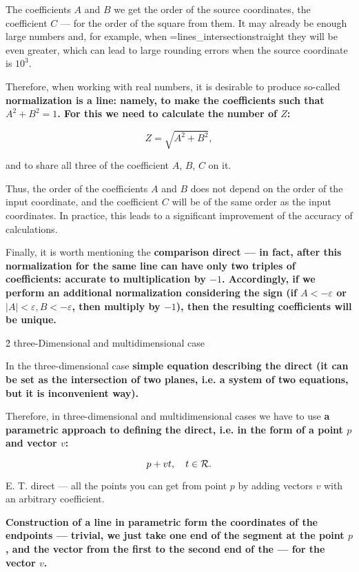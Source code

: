 The coefficients $A$ and $B$ we get the order of the source coordinates, the coefficient $C$ --- for the order of the square from them. It may already be enough large numbers and, for example, when \algohref=lines_intersection{straight} they will be even greater, which can lead to large rounding errors when the source coordinate is $10^3$.

Therefore, when working with real numbers, it is desirable to produce so-called \bf{normalization} is a line: namely, to make the coefficients such that $A^2 + B^2 = 1$. For this we need to calculate the number of $Z$:

$$ Z = \sqrt{ A^2 + B^2 }, $$

and to share all three of the coefficient $A$, $B$, $C$ on it.

Thus, the order of the coefficients $A$ and $B$ does not depend on the order of the input coordinate, and the coefficient $C$ will be of the same order as the input coordinates. In practice, this leads to a significant improvement of the accuracy of calculations.

Finally, it is worth mentioning the \bf{comparison} direct --- in fact, after this normalization for the same line can have only two triples of coefficients: accurate to multiplication by $-1$. Accordingly, if we perform an additional normalization considering the sign (if $A<-\varepsilon$ or $|A|<\varepsilon, B<-\varepsilon$, then multiply by $-1$), then the resulting coefficients will be unique.


\h2{ three-Dimensional and multidimensional case }

In the three-dimensional case \bf{simple equation} describing the direct (it can be set as the intersection of two planes, i.e. a system of two equations, but it is inconvenient way).

Therefore, in three-dimensional and multidimensional cases we have to use \bf{a parametric approach to defining the direct}, i.e. in the form of a point $p$ and vector $v$:

$$ p + v t, ~~~ t \in \cal{R}. $$

E. T. direct --- all the points you can get from point $p$ by adding vectors $v$ with an arbitrary coefficient.

\bf{Construction} of a line in parametric form the coordinates of the endpoints --- trivial, we just take one end of the segment at the point $p$, and the vector from the first to the second end of the --- for the vector $v$.